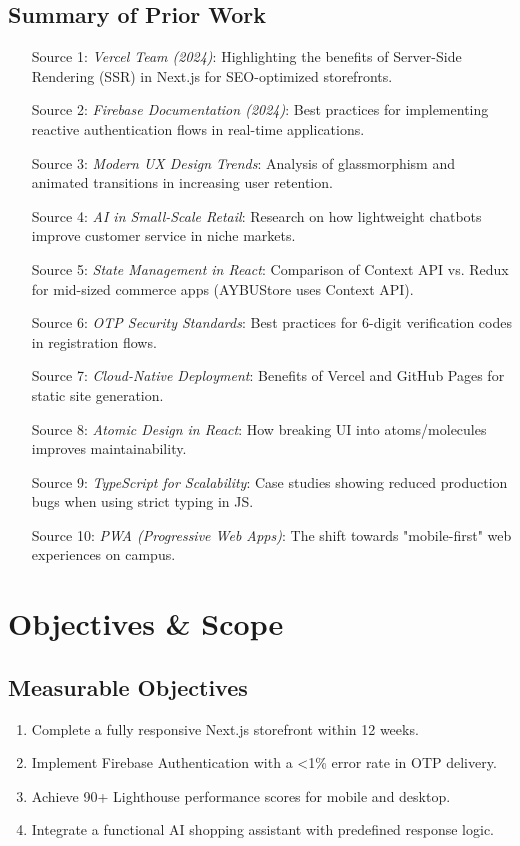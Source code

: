 \documentclass[11pt]{article}
\newcommand{\scorebox}[1]{%
  \hfill\fcolorbox{black}{gray!10}{\textbf{#1}}%
}
\newcommand{\scoredsection}[2]{\section{\texorpdfstring{#1~\scorebox{#2}}{#1}}}
\begin{document}
\subsection*{Summary of Prior Work}
\begin{enumerate}
    \item [Source 1:] \textit{Vercel Team (2024)}: Highlighting the benefits of Server-Side Rendering (SSR) in Next.js for SEO-optimized storefronts.
    \item [Source 2:] \textit{Firebase Documentation (2024)}: Best practices for implementing reactive authentication flows in real-time applications.
    \item [Source 3:] \textit{Modern UX Design Trends}: Analysis of glassmorphism and animated transitions in increasing user retention.
    \item [Source 4:] \textit{AI in Small-Scale Retail}: Research on how lightweight chatbots improve customer service in niche markets.
    \item [Source 5:] \textit{State Management in React}: Comparison of Context API vs. Redux for mid-sized commerce apps (AYBUStore uses Context API).
    \item [Source 6:] \textit{OTP Security Standards}: Best practices for 6-digit verification codes in registration flows.
    \item [Source 7:] \textit{Cloud-Native Deployment}: Benefits of Vercel and GitHub Pages for static site generation.
    \item [Source 8:] \textit{Atomic Design in React}: How breaking UI into atoms/molecules improves maintainability.
    \item [Source 9:] \textit{TypeScript for Scalability}: Case studies showing reduced production bugs when using strict typing in JS.
    \item [Source 10:] \textit{PWA (Progressive Web Apps)}: The shift towards "mobile-first" web experiences on campus.
\end{enumerate}

\scoredsection{Objectives \& Scope}{Related rubric: 15 pts + 10 pts + 4 pts}
\subsection*{Measurable Objectives}
\begin{enumerate}
    \item Complete a fully responsive Next.js storefront within 12 weeks.
    \item Implement Firebase Authentication with a <1\% error rate in OTP delivery.
    \item Achieve 90+ Lighthouse performance scores for mobile and desktop.
    \item Integrate a functional AI shopping assistant with predefined response logic.
\end{enumerate}
\end{document}
